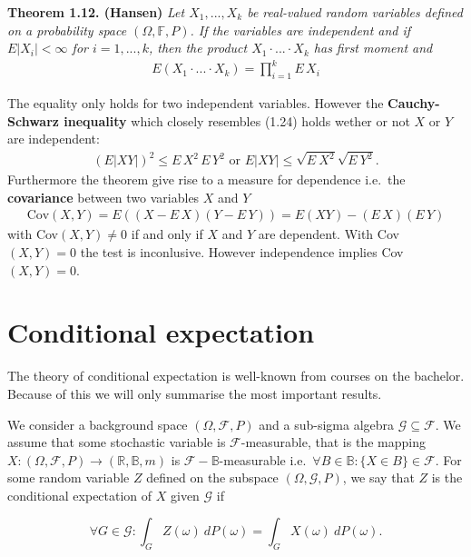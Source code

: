 \documentclass[a4paper,12pt,openany]{book}
\begin{document}
\textbf{Theorem 1.12. (Hansen)} \emph{Let \(X_1,...,X_k\) be real-valued random variables defined on a probability space \((\Omega, \mathbb{F},P)\). If the variables are independent and if \(E\vert X_i\vert<\infty\) for \(i=1,...,k\), then the product \(X_1\cdot ...\cdot X_k\) has first moment and}
\begin{align*}
    E\left(X_1\cdot ... \cdot X_k\right)=\prod_{i=1}^kE\, X_i\tag{1.24}
\end{align*}

The equality only holds for two independent variables. However the \textbf{Cauchy-Schwarz inequality} which closely resembles (1.24) holds wether or not \(X\) or \(Y\) are independent:
\begin{align*}
    \left(E\vert XY\vert\right)^2\le E\, X^2\, E\, Y^2\text{ or }E\vert XY\vert \le \sqrt{E\ X^2}\sqrt{E\ Y^2}.\tag{1.25}
\end{align*}
Furthermore the theorem give rise to a measure for dependence i.e.~the \textbf{covariance} between two variables \(X\) and \(Y\)
\begin{align*}
    \text{Cov}(X,Y)=E\left((X-E\,X)(Y-E\,Y)\right)=E(XY)-(E\, X)(E\, Y)\tag{1.26}
\end{align*}
with Cov\((X,Y)\ne 0\) if and only if \(X\) and \(Y\) are dependent. With Cov\((X,Y)=0\) the test is inconlusive. However independence implies Cov\((X,Y)=0\).

\hypertarget{conditional-expectation}{%
\section{Conditional expectation}\label{conditional-expectation}}

The theory of conditional expectation is well-known from courses on the bachelor. Because of this we will only summarise the most important results.

We consider a background space \((\Omega,\mathcal{F},P)\) and a sub-sigma algebra \(\mathcal{G}\subseteq \mathcal{F}\). We assume that some stochastic variable is \(\mathcal{F}\)-measurable, that is the mapping \(X : (\Omega,\mathcal{F},P) \to (\mathbb{R},\mathbb{B},m)\) is \(\mathcal{F}-\mathbb{B}\)-measurable i.e.~\(\forall B\in\mathbb{B} : \{X\in B\}\in\mathcal{F}\). For some random variable \(Z\) defined on the subspace \((\Omega,\mathcal{G},P)\), we say that \(Z\) is the conditional expectation of \(X\) given \(\mathcal{G}\) if

\[
\forall G\in\mathcal{G} : \int_G Z(\omega)\ dP(\omega)=\int_G X(\omega)\ dP(\omega).
\]
\end{document}
